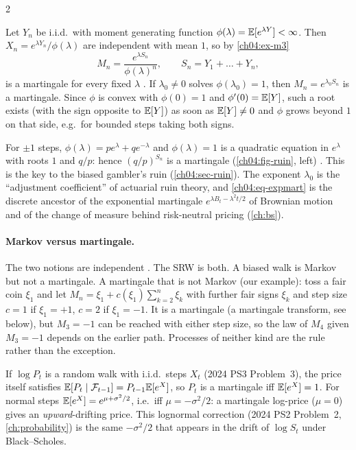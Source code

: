 \begin{paracol}{2}
\begin{example}\label{ch04:ex-m4}
Let $Y_n$ be i.i.d.\ with moment generating function $\phi(\lambda)=\mathbb{E}[e^{\lambda Y}]<\infty$. Then
$X_n=e^{\lambda Y_n}/\phi(\lambda)$ are independent with mean $1$, so by \cref{ch04:ex-m3}
\begin{equation}\label{ch04:eq-expmart}
  M_n=\frac{e^{\lambda S_n}}{\phi(\lambda)^n},\qquad S_n=Y_1+\dots+Y_n,
\end{equation}
is a martingale for every fixed $\lambda$ . If $\lambda_0\ne0$ solves $\phi(\lambda_0)=1$,
then $M_n=e^{\lambda_0S_n}$ is a martingale. Since $\phi$ is convex with $\phi(0)=1$ and $\phi'(0)=\mathbb{E}[Y]$, such
a root exists (with the sign opposite to $\mathbb{E}[Y]$) as soon as $\mathbb{E}[Y]\ne0$ and $\phi$ grows beyond $1$ on that side,
e.g.\ for bounded steps taking both signs.
\end{example}
For $\pm1$ steps, $\phi(\lambda)=pe^\lambda+qe^{-\lambda}$ and $\phi(\lambda)=1$ is a quadratic equation in
$e^\lambda$ with roots $1$ and $q/p$: hence $(q/p)^{S_n}$ is a martingale (\cref{ch04:fig-ruin}, left)
. This is the key to the biased gambler's ruin (\cref{ch04:sec-ruin}). The exponent
$\lambda_0$ is the ``adjustment coefficient'' of actuarial ruin theory, and \eqref{ch04:eq-expmart} is the
discrete ancestor of the exponential martingale $e^{\lambda B_t-\lambda^2t/2}$ of Brownian motion and of
the change of measure behind risk-neutral pricing (\cref{ch:bs}).

\paragraph{Markov versus martingale.} The two notions are independent . The SRW is both.
A biased walk is Markov but not a martingale. A martingale that is not Markov (our example): toss a fair
coin $\xi_1$ and let $M_n=\xi_1+c(\xi_1)\sum_{k=2}^n\xi_k$ with further fair signs $\xi_k$ and step size
$c=1$ if $\xi_1=+1$, $c=2$ if $\xi_1=-1$. It is a martingale (a martingale transform, see below), but
$M_3=-1$ can be reached with either step size, so the law of $M_4$ given $M_3=-1$ depends on the earlier path.
Processes of neither kind are the rule rather than the exception.

\begin{remark}\label{ch04:rem-logprice}
If $\log P_t$ is a random walk with i.i.d.\ steps $X_t$ (2024 PS3 Problem~3), the price itself satisfies
$\mathbb{E}[P_t\mid\mathcal F_{t-1}]=P_{t-1}\mathbb{E}[e^{X}]$, so $P_t$ is a martingale iff $\mathbb{E}[e^X]=1$. For normal steps
$\mathbb{E}[e^X]=e^{\mu+\sigma^2/2}$, i.e.\ iff $\mu=-\sigma^2/2$: a martingale log-price ($\mu=0$) gives an
\emph{upward}-drifting price. This lognormal correction (2024 PS2 Problem~2, \cref{ch:probability}) is the same
$-\sigma^2/2$ that appears in the drift of $\log S_t$ under Black--Scholes.
\end{remark}


\end{paracol}
